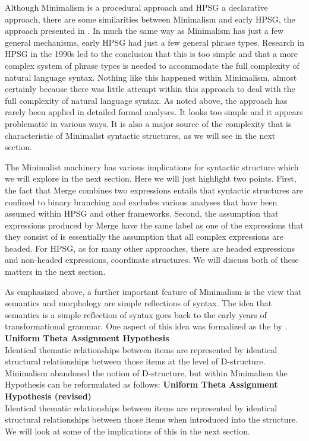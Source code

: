 \documentclass[output=paper]{langsci/langscibook}
\begin{document}
Although Minimalism is a procedural approach and HPSG a declarative approach, there are some similarities between Minimalism and early HPSG, the approach presented in \citet{ps,ps2}. In much the same way as Minimalism has just a few general mechanisms, early HPSG had just a few general phrase types. Research in HPSG in the 1990s led to the conclusion that this is too simple and that a more complex system of phrase types is needed to accommodate the full complexity of natural language syntax. Nothing like this happened within Minimalism, almost certainly because there was little attempt within this approach to deal with the full complexity of natural language syntax. As noted above, the approach has rarely been applied in detailed formal analyses. It looks too simple and it appears problematic in various ways. It is also a major source of the complexity that is characteristic of Minimalist syntactic structures, as we will see in the next section.

The Minimalist machinery has various implications for syntactic structure which we will explore in the next section. Here we will just highlight two points. First, the fact that Merge combines two expressions entails that syntactic structures are confined to binary branching and excludes various analyses that have been assumed within HPSG and other frameworks. Second, the assumption that expressions produced by Merge have the same label as one of the expressions that they consist of is essentially the assumption that all complex expressions are headed. For HPSG, as for many other approaches, there are headed expressions and non-headed expressions, \eg coordinate structures. We will discuss both of these matters in the next section.

As emphasized above, a further important feature of Minimalism is the view that semantics and morphology are simple reflections of syntax. The idea that semantics is a simple reflection of syntax goes back to the early years of transformational grammar. One aspect of this idea was formalized as the  by \citet[46]{Baker88a}.
\ea\label{ex:min-UTAH}
\textbf{Uniform Theta Assignment Hypothesis}\\
Identical thematic relationships between items are represented by identical structural relationships between those items at the level of D-structure.
\z
Minimalism abandoned the notion of D-structure, but within Minimalism the Hypothesis can be reformulated as follows:
\ea\label{ex:min-UTAH-revised}
\textbf{Uniform Theta Assignment Hypothesis (revised)}\\
Identical thematic relationships between items are represented by identical structural relationships between those items when introduced into the structure.
\z
We will look at some of the implications of this in the next section.
\end{document}
